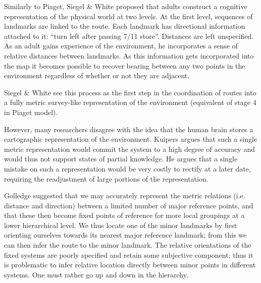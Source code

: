 Similarly to Piaget, Siegel \& White \cite{psycho_siegel75} proposed
that adults construct a cognitive representation of the physical world
at two levels. At the first level, sequences of landmarks are linked
to the route. Each landmark has directional information attached to
it: ``turn left after passing 7/11 store''. Distances are left
unspecified. As an adult gains experience of the environment, he
incorporates a sense of relative distances between landmarks. As this
information gets incorporated into the map it becomes possible to
recover bearing between any two points in the environment regardless
of whether or not they are adjacent.

Siegel \& White \cite{psycho_siegel75} see this process as the first
step in the coordination of routes into a fully metric survey-like
representation of the environment (equivalent of stage 4 in Piaget model).

However, many researchers disagree with the idea that the human brain
stores a cartographic representation of the environment. Kuipers
\cite{psycho_kuipers82} argues that such a single metric
representation would commit the system to a high degree of accuracy
and would thus not support states of partial knowledge. He argues that
a single mistake on such a representation would be very costly to
rectify at a later date, requiring the readjustment of large portions
of the representation.

Golledge \cite{psycho_golledge87} suggested that we may accurately
represent the metric relations (i.e. distance and direction) between a
limited number of major reference points, and that these then become
fixed points of reference for more local groupings at a lower
hierarchical level. We thus locate one of the minor landmarks by first
orienting ourselves towards its nearest major reference landmark; from
this we can then infer the route to the minor landmark. The relative
orientations of the fixed systems are poorly specified and retain some
subjective component; thus it is problematic to infer relative
location directly between minor points in different systems. One must
rather go up and down in the hierarchy.


